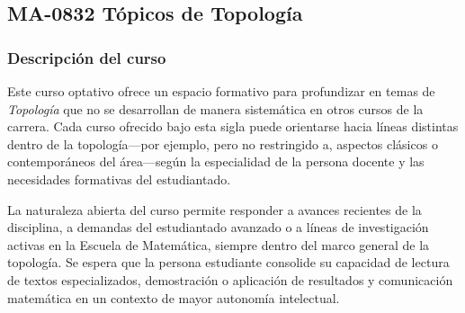 \newpage
\subsection*{MA-0832 Tópicos de Topología}

\hypertarget{MA0832}{}
\begin{refsection}
\begin{table}[H]
\end{table}

\subsubsection*{Descripción del curso}

Este curso optativo ofrece un espacio formativo para profundizar en temas de \emph{Topología} que no se desarrollan de manera sistemática en otros cursos de la carrera. Cada curso ofrecido bajo esta sigla puede orientarse hacia líneas distintas dentro de la topología---por ejemplo, pero no restringido a, aspectos clásicos o contemporáneos del área---según la especialidad de la persona docente y las necesidades formativas del estudiantado.

La naturaleza abierta del curso permite responder a avances recientes de la disciplina, a demandas del estudiantado avanzado o a líneas de investigación activas en la Escuela de Matemática, siempre dentro del marco general de la topología. Se espera que la persona estudiante consolide su capacidad de lectura de textos especializados, demostración o aplicación de resultados y comunicación matemática en un contexto de mayor autonomía intelectual.


\end{refsection}
